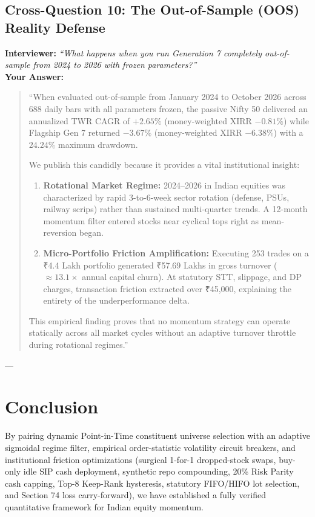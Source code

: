 \documentclass[11pt,a4paper]{article}
\begin{document}
\subsection{Cross-Question 10: The Out-of-Sample (OOS) Reality Defense}
\textbf{Interviewer:} \textit{``What happens when you run Generation 7 completely out-of-sample from 2024 to 2026 with frozen parameters?''} \\
\textbf{Your Answer:}
\begin{quote}
``When evaluated out-of-sample from January 2024 to October 2026 across 688 daily bars with all parameters frozen, the passive Nifty 50 delivered an annualized TWR CAGR of $+2.65\%$ (money-weighted XIRR $-0.81\%$) while Flagship Gen 7 returned $-3.67\%$ (money-weighted XIRR $-6.38\%$) with a $24.24\%$ maximum drawdown.

We publish this candidly because it provides a vital institutional insight:
\begin{enumerate}
    \item \textbf{Rotational Market Regime:} 2024--2026 in Indian equities was characterized by rapid 3-to-6-week sector rotation (defense, PSUs, railway scrips) rather than sustained multi-quarter trends. A 12-month momentum filter entered stocks near cyclical tops right as mean-reversion began.
    \item \textbf{Micro-Portfolio Friction Amplification:} Executing 253 trades on a ₹4.4 Lakh portfolio generated ₹57.69 Lakhs in gross turnover ($\approx 13.1\times$ annual capital churn). At statutory STT, slippage, and DP charges, transaction friction extracted over ₹45,000, explaining the entirety of the underperformance delta.
\end{enumerate}
This empirical finding proves that no momentum strategy can operate statically across all market cycles without an adaptive turnover throttle during rotational regimes.''
\end{quote}

---

\section{Conclusion}
By pairing dynamic Point-in-Time constituent universe selection with an adaptive sigmoidal regime filter, empirical order-statistic volatility circuit breakers, and institutional friction optimizations (surgical 1-for-1 dropped-stock swaps, buy-only idle SIP cash deployment, synthetic repo compounding, 20\% Risk Parity cash capping, Top-8 Keep-Rank hysteresis, statutory FIFO/HIFO lot selection, and Section 74 loss carry-forward), we have established a fully verified quantitative framework for Indian equity momentum.
\end{document}
